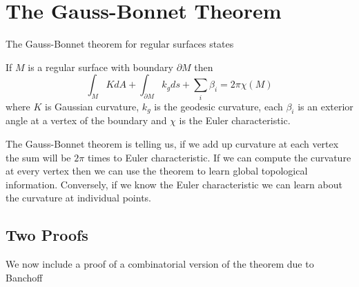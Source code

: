 \section{The Gauss-Bonnet Theorem}



The Gauss-Bonnet theorem for regular surfaces states

\begin{theorem} \label{thm:g-b-c}

If $M$ is a regular surface with boundary $\partial M$ then
	$$\int_{M} K dA+ \int_{\partial M} k_g ds + \sum_i \beta_i= 2\pi \chi(M)$$
	where  $K$ is Gaussian curvature,
	 $k_g$ is the geodesic curvature,
	 each $\beta_i$  is an exterior angle at a vertex of the boundary and
	$\chi$ is the Euler characteristic.
\end{theorem}


The  Gauss-Bonnet theorem is  telling us, if we add up curvature
at each vertex the sum will be $2\pi$ times to Euler characteristic.
If we can compute the curvature at every vertex then we can use the theorem
to learn global topological information.
Conversely, if we know the Euler characteristic we can learn about the curvature
at individual points.

\subsection{Two Proofs}
We now include a proof of a combinatorial version of the theorem due to Banchoff
\cite{banchoff_critical_1970}
